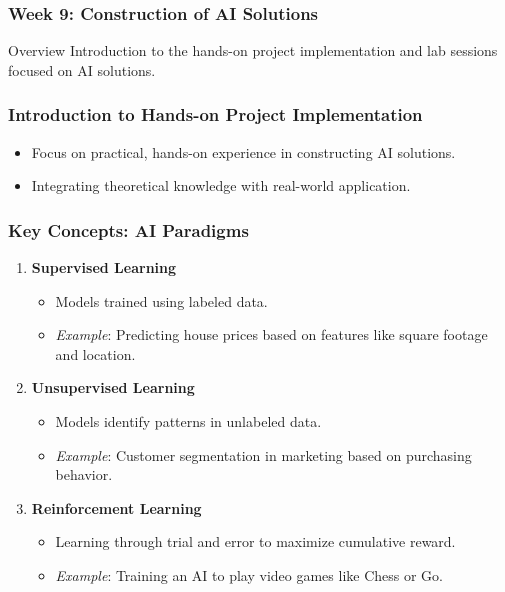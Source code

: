 \documentclass[aspectratio=169]{beamer}
\begin{document}
\frame{\titlepage}

\begin{frame}[fragile]
    \frametitle{Week 9: Construction of AI Solutions}
    \begin{block}{Overview}
        Introduction to the hands-on project implementation and lab sessions focused on AI solutions.
    \end{block}
\end{frame}

\begin{frame}[fragile]
    \frametitle{Introduction to Hands-on Project Implementation}
    \begin{itemize}
        \item Focus on practical, hands-on experience in constructing AI solutions.
        \item Integrating theoretical knowledge with real-world application.
    \end{itemize}
\end{frame}

\begin{frame}[fragile]
    \frametitle{Key Concepts: AI Paradigms}
    \begin{enumerate}
        \item \textbf{Supervised Learning}
            \begin{itemize}
                \item Models trained using labeled data.
                \item \textit{Example}: Predicting house prices based on features like square footage and location.
            \end{itemize}
        \item \textbf{Unsupervised Learning}
            \begin{itemize}
                \item Models identify patterns in unlabeled data.
                \item \textit{Example}: Customer segmentation in marketing based on purchasing behavior.
            \end{itemize}
        \item \textbf{Reinforcement Learning}
            \begin{itemize}
                \item Learning through trial and error to maximize cumulative reward.
                \item \textit{Example}: Training an AI to play video games like Chess or Go.
            \end{itemize}
    \end{enumerate}
\end{frame}
\end{document}

